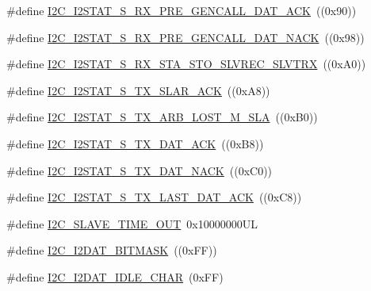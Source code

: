 \begin{DoxyCompactItemize}
\item 
\#define \hyperlink{group___i2_c__18_x_x__43_x_x_ga75dd46ddb054c4d47a531b8e90f7f446}{I2\+C\+\_\+\+I2\+S\+T\+A\+T\+\_\+\+S\+\_\+\+R\+X\+\_\+\+P\+R\+E\+\_\+\+G\+E\+N\+C\+A\+L\+L\+\_\+\+D\+A\+T\+\_\+\+A\+CK}~((0x90))
\item 
\#define \hyperlink{group___i2_c__18_x_x__43_x_x_ga20c65f8a82c18211127e5c335026bd76}{I2\+C\+\_\+\+I2\+S\+T\+A\+T\+\_\+\+S\+\_\+\+R\+X\+\_\+\+P\+R\+E\+\_\+\+G\+E\+N\+C\+A\+L\+L\+\_\+\+D\+A\+T\+\_\+\+N\+A\+CK}~((0x98))
\item 
\#define \hyperlink{group___i2_c__18_x_x__43_x_x_ga7afe9f0e54aeb9ce8428c0adeb3c3274}{I2\+C\+\_\+\+I2\+S\+T\+A\+T\+\_\+\+S\+\_\+\+R\+X\+\_\+\+S\+T\+A\+\_\+\+S\+T\+O\+\_\+\+S\+L\+V\+R\+E\+C\+\_\+\+S\+L\+V\+T\+RX}~((0x\+A0))
\item 
\#define \hyperlink{group___i2_c__18_x_x__43_x_x_gae6dcbdd1f01f7ebf3595722770e3b7b6}{I2\+C\+\_\+\+I2\+S\+T\+A\+T\+\_\+\+S\+\_\+\+T\+X\+\_\+\+S\+L\+A\+R\+\_\+\+A\+CK}~((0x\+A8))
\item 
\#define \hyperlink{group___i2_c__18_x_x__43_x_x_gac71ac23a80e1bdb700a2c37170031107}{I2\+C\+\_\+\+I2\+S\+T\+A\+T\+\_\+\+S\+\_\+\+T\+X\+\_\+\+A\+R\+B\+\_\+\+L\+O\+S\+T\+\_\+\+M\+\_\+\+S\+LA}~((0x\+B0))
\item 
\#define \hyperlink{group___i2_c__18_x_x__43_x_x_gaeb92fe85cc3f6c813cb91685234ac08c}{I2\+C\+\_\+\+I2\+S\+T\+A\+T\+\_\+\+S\+\_\+\+T\+X\+\_\+\+D\+A\+T\+\_\+\+A\+CK}~((0x\+B8))
\item 
\#define \hyperlink{group___i2_c__18_x_x__43_x_x_gad9cdcd8c06924252a2ad9baced97d838}{I2\+C\+\_\+\+I2\+S\+T\+A\+T\+\_\+\+S\+\_\+\+T\+X\+\_\+\+D\+A\+T\+\_\+\+N\+A\+CK}~((0x\+C0))
\item 
\#define \hyperlink{group___i2_c__18_x_x__43_x_x_ga3e4522387958da1da6017a6e48a0daad}{I2\+C\+\_\+\+I2\+S\+T\+A\+T\+\_\+\+S\+\_\+\+T\+X\+\_\+\+L\+A\+S\+T\+\_\+\+D\+A\+T\+\_\+\+A\+CK}~((0x\+C8))
\item 
\#define \hyperlink{group___i2_c__18_x_x__43_x_x_ga33116b352c72ef28879812c66387f17a}{I2\+C\+\_\+\+S\+L\+A\+V\+E\+\_\+\+T\+I\+M\+E\+\_\+\+O\+UT}~0x10000000\+UL
\item 
\#define \hyperlink{group___i2_c__18_x_x__43_x_x_gac66b7c81c93cc59f69d204b4eb7d639b}{I2\+C\+\_\+\+I2\+D\+A\+T\+\_\+\+B\+I\+T\+M\+A\+SK}~((0x\+F\+F))
\item 
\#define \hyperlink{group___i2_c__18_x_x__43_x_x_ga5b04af302e0e4007df123dff0328ac5e}{I2\+C\+\_\+\+I2\+D\+A\+T\+\_\+\+I\+D\+L\+E\+\_\+\+C\+H\+AR}~(0x\+F\+F)
\item 

\end{DoxyCompactItemize}

